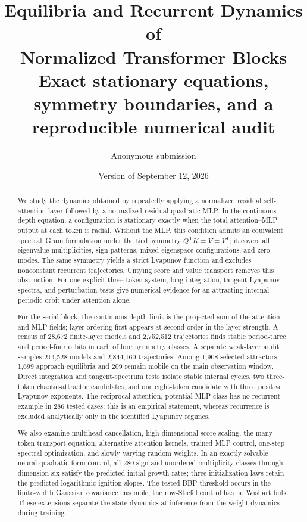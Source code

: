 \documentclass[11pt,a4paper]{article}
\title{\textbf{Equilibria and Recurrent Dynamics of\\
Normalized Transformer Blocks}\\[0.45em]
\large Exact stationary equations, symmetry boundaries, and a reproducible
numerical audit}
\author{Anonymous submission}
\date{Version of September 12, 2026}
\theoremstyle{definition}
\begin{document}
\maketitle

\begin{abstract}
We study the dynamics obtained by repeatedly applying a normalized residual
self-attention layer followed by a normalized residual quadratic MLP.  In the
continuous-depth equation, a configuration is stationary exactly when the total
attention--MLP output at each token is radial.  Without the MLP, this condition admits
an equivalent spectral--Gram formulation under the tied symmetry
$Q^{\mathsf T}K=V=V^{\mathsf T}$; it covers all eigenvalue multiplicities, sign
patterns, mixed eigenspace configurations, and zero modes.  The same symmetry yields
a strict Lyapunov function and excludes nonconstant recurrent trajectories.  Untying
score and value transport removes this obstruction.  For one explicit three-token
system, long integration, tangent Lyapunov spectra, and perturbation tests give numerical
evidence for an attracting internal periodic orbit under attention alone.

For the serial block, the continuous-depth limit is the projected sum of the
attention and MLP fields; layer ordering first appears at second order in the layer
strength.  A census of 28,672 finite-layer models and 2,752,512 trajectories finds
stable period-three and period-four orbits in each of four symmetry classes.  A
separate weak-layer audit samples 214,528 models and 2,844,160 trajectories.  Among
1,908 selected attractors, 1,699 approach equilibria and 209 remain mobile on the main
observation window.  Direct integration and tangent-spectrum tests isolate stable
internal cycles, two three-token chaotic-attractor candidates, and one eight-token candidate
with three positive Lyapunov exponents.  The reciprocal-attention, potential-MLP
class has no recurrent example in 286 tested cases; this is an empirical statement,
whereas recurrence is excluded analytically only in the identified Lyapunov regimes.

We also examine multihead cancellation, high-dimensional score scaling, the
many-token transport equation, alternative attention kernels, trained MLP control,
one-step spectral optimization, and slowly varying random weights.  In an exactly
solvable neural-quadratic-form control, all 280 sign and unordered-multiplicity classes
through dimension six satisfy the predicted initial growth rates; three initialization
laws retain the predicted logarithmic ignition slopes.  The tested BBP threshold
occurs in the finite-width Gaussian covariance ensemble; the row-Stiefel control has
no Wishart bulk.  These extensions separate the state dynamics at inference from the
weight dynamics during training.


\end{abstract}
\end{document}
